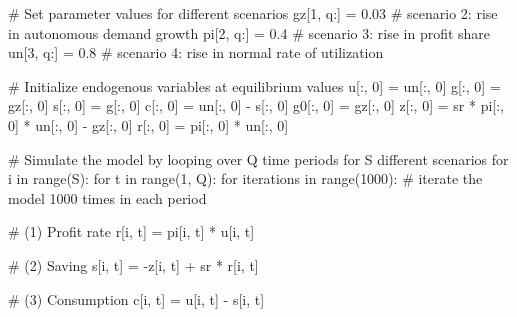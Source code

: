 \documentclass[
  letterpaper,
  DIV=11,
  numbers=noendperiod]{scrreprt}
\newenvironment{Shaded}{\begin{snugshade}}{\end{snugshade}}
\newcommand{\BuiltInTok}[1]{\textcolor[rgb]{0.00,0.23,0.31}{#1}}
\newcommand{\CommentTok}[1]{\textcolor[rgb]{0.37,0.37,0.37}{#1}}
\newcommand{\ControlFlowTok}[1]{\textcolor[rgb]{0.00,0.23,0.31}{#1}}
\newcommand{\DecValTok}[1]{\textcolor[rgb]{0.68,0.00,0.00}{#1}}
\newcommand{\FloatTok}[1]{\textcolor[rgb]{0.68,0.00,0.00}{#1}}
\newcommand{\KeywordTok}[1]{\textcolor[rgb]{0.00,0.23,0.31}{#1}}
\newcommand{\NormalTok}[1]{\textcolor[rgb]{0.00,0.23,0.31}{#1}}
\newcommand{\OperatorTok}[1]{\textcolor[rgb]{0.37,0.37,0.37}{#1}}
\begin{document}
\begin{tcolorbox}
\begin{Shaded}
\begin{Highlighting}[]
\CommentTok{\# Set parameter values for different scenarios}
\NormalTok{gz[}\DecValTok{1}\NormalTok{, q:] }\OperatorTok{=} \FloatTok{0.03}  \CommentTok{\# scenario 2: rise in autonomous demand growth}
\NormalTok{pi[}\DecValTok{2}\NormalTok{, q:] }\OperatorTok{=} \FloatTok{0.4}   \CommentTok{\# scenario 3: rise in profit share}
\NormalTok{un[}\DecValTok{3}\NormalTok{, q:] }\OperatorTok{=} \FloatTok{0.8}   \CommentTok{\# scenario 4: rise in normal rate of utilization}

\CommentTok{\# Initialize endogenous variables at equilibrium values}
\NormalTok{u[:, }\DecValTok{0}\NormalTok{] }\OperatorTok{=}\NormalTok{ un[:, }\DecValTok{0}\NormalTok{]}
\NormalTok{g[:, }\DecValTok{0}\NormalTok{] }\OperatorTok{=}\NormalTok{ gz[:, }\DecValTok{0}\NormalTok{]}
\NormalTok{s[:, }\DecValTok{0}\NormalTok{] }\OperatorTok{=}\NormalTok{ g[:, }\DecValTok{0}\NormalTok{]}
\NormalTok{c[:, }\DecValTok{0}\NormalTok{] }\OperatorTok{=}\NormalTok{ un[:, }\DecValTok{0}\NormalTok{] }\OperatorTok{{-}}\NormalTok{ s[:, }\DecValTok{0}\NormalTok{]}
\NormalTok{g0[:, }\DecValTok{0}\NormalTok{] }\OperatorTok{=}\NormalTok{ gz[:, }\DecValTok{0}\NormalTok{]}
\NormalTok{z[:, }\DecValTok{0}\NormalTok{] }\OperatorTok{=}\NormalTok{ sr }\OperatorTok{*}\NormalTok{ pi[:, }\DecValTok{0}\NormalTok{] }\OperatorTok{*}\NormalTok{ un[:, }\DecValTok{0}\NormalTok{] }\OperatorTok{{-}}\NormalTok{ gz[:, }\DecValTok{0}\NormalTok{]}
\NormalTok{r[:, }\DecValTok{0}\NormalTok{] }\OperatorTok{=}\NormalTok{ pi[:, }\DecValTok{0}\NormalTok{] }\OperatorTok{*}\NormalTok{ un[:, }\DecValTok{0}\NormalTok{]}

\CommentTok{\# Simulate the model by looping over Q time periods for S different scenarios}
\ControlFlowTok{for}\NormalTok{ i }\KeywordTok{in} \BuiltInTok{range}\NormalTok{(S):}
    \ControlFlowTok{for}\NormalTok{ t }\KeywordTok{in} \BuiltInTok{range}\NormalTok{(}\DecValTok{1}\NormalTok{, Q):}
        \ControlFlowTok{for}\NormalTok{ iterations }\KeywordTok{in} \BuiltInTok{range}\NormalTok{(}\DecValTok{1000}\NormalTok{):  }\CommentTok{\# iterate the model 1000 times in each period}

            \CommentTok{\# (1) Profit rate}
\NormalTok{            r[i, t] }\OperatorTok{=}\NormalTok{ pi[i, t] }\OperatorTok{*}\NormalTok{ u[i, t]}

            \CommentTok{\# (2) Saving}
\NormalTok{            s[i, t] }\OperatorTok{=} \OperatorTok{{-}}\NormalTok{z[i, t] }\OperatorTok{+}\NormalTok{ sr }\OperatorTok{*}\NormalTok{ r[i, t]}

            \CommentTok{\# (3) Consumption}
\NormalTok{            c[i, t] }\OperatorTok{=}\NormalTok{ u[i, t] }\OperatorTok{{-}}\NormalTok{ s[i, t]}


\end{Highlighting}
\end{Shaded}
\end{tcolorbox}
\end{document}
